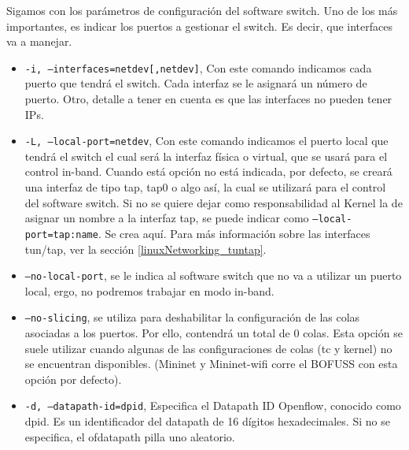 Sigamos con los parámetros de configuración del software switch. Uno de los más importantes, es indicar los puertos a gestionar el switch. Es decir, que interfaces va a manejar.

\begin{itemize}
    \item \texttt{-i, --interfaces=netdev[,netdev]}, Con este comando indicamos cada puerto que tendrá el switch. Cada interfaz se le asignará un número de puerto. Otro, detalle a tener en cuenta es que las interfaces no pueden tener IPs.

    \item \texttt{-L, --local-port=netdev}, Con este comando indicamos el puerto local que tendrá el switch el cual será la interfaz física o virtual, que se usará para el control in-band. Cuando está opción no está indicada, por defecto, se creará una interfaz de tipo tap, tap0 o algo así, la cual se utilizará para el control del software switch. Si no se quiere dejar como responsabilidad al Kernel la de asignar un nombre a la interfaz tap, se puede indicar como \texttt{--local-port=tap:name}. Se crea aquí. Para más información sobre las interfaces tun/tap, ver la sección \ref{linuxNetworking_tuntap}.

    \item \texttt{--no-local-port}, se le indica al software switch que no va a utilizar un puerto local, ergo, no podremos trabajar en modo in-band.

    \item \texttt{--no-slicing}, se utiliza para deshabilitar la configuración de las colas asociadas a los puertos. Por ello, contendrá un total de 0 colas. Esta opción se suele utilizar cuando algunas de las configuraciones de colas (tc y kernel) no se encuentran disponibles. (Mininet y Mininet-wifi corre el BOFUSS con esta opción por defecto).

    \item \texttt{-d, --datapath-id=dpid}, Especifica el Datapath ID Openflow, conocido como dpid. Es un identificador del datapath de 16 dígitos hexadecimales. Si no se especifica, el ofdatapath pilla uno aleatorio.
\end{itemize}